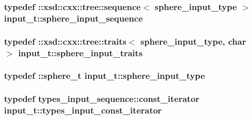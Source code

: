 \subsubsection[{\texorpdfstring{sphere\+\_\+input\+\_\+sequence}{sphere_input_sequence}}]{\setlength{\rightskip}{0pt plus 5cm}typedef \+::xsd\+::cxx\+::tree\+::sequence$<$ {\bf sphere\+\_\+input\+\_\+type} $>$ {\bf input\+\_\+t\+::sphere\+\_\+input\+\_\+sequence}}\hypertarget{classinput__t_aa968afe5c55f7cc3031e6196adddcae5}{}\label{classinput__t_aa968afe5c55f7cc3031e6196adddcae5}
\subsubsection[{\texorpdfstring{sphere\+\_\+input\+\_\+traits}{sphere_input_traits}}]{\setlength{\rightskip}{0pt plus 5cm}typedef \+::xsd\+::cxx\+::tree\+::traits$<$ {\bf sphere\+\_\+input\+\_\+type}, char $>$ {\bf input\+\_\+t\+::sphere\+\_\+input\+\_\+traits}}\hypertarget{classinput__t_afb3a266016b34553b5f045eaddf78031}{}\label{classinput__t_afb3a266016b34553b5f045eaddf78031}
\subsubsection[{\texorpdfstring{sphere\+\_\+input\+\_\+type}{sphere_input_type}}]{\setlength{\rightskip}{0pt plus 5cm}typedef \+::{\bf sphere\+\_\+t} {\bf input\+\_\+t\+::sphere\+\_\+input\+\_\+type}}\hypertarget{classinput__t_a75628386280268669a4cc94066bd8547}{}\label{classinput__t_a75628386280268669a4cc94066bd8547}
\subsubsection[{\texorpdfstring{types\+\_\+input\+\_\+const\+\_\+iterator}{types_input_const_iterator}}]{\setlength{\rightskip}{0pt plus 5cm}typedef types\+\_\+input\+\_\+sequence\+::const\+\_\+iterator {\bf input\+\_\+t\+::types\+\_\+input\+\_\+const\+\_\+iterator}}\hypertarget{classinput__t_a7fddef7619e8c4dd76b1c6448c42bfc0}{}\label{classinput__t_a7fddef7619e8c4dd76b1c6448c42bfc0}
